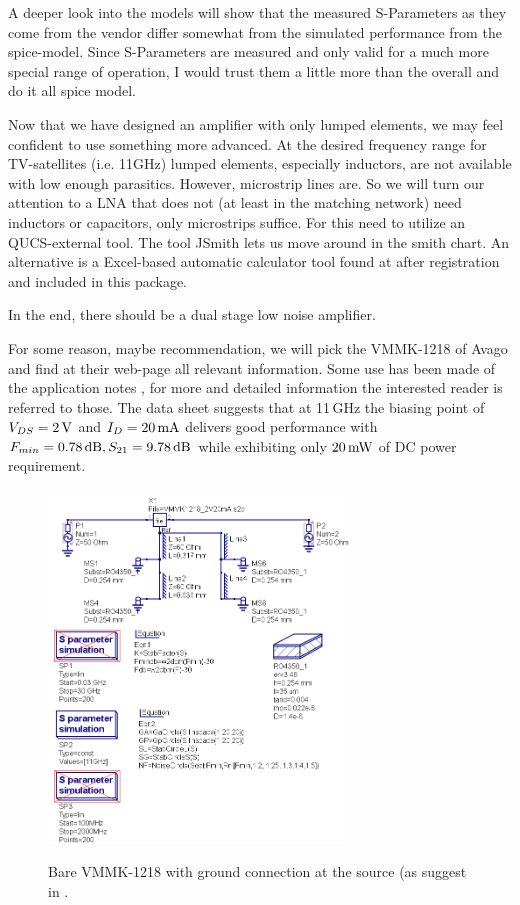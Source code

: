 A deeper look into the models will show that the measured S-Parameters
as they come from the vendor differ somewhat from the simulated
performance from the spice-model. Since S-Parameters are measured and
only valid for a much more special range of operation, I would trust
them a little more than the overall and do it all spice model.


Now that we have designed an amplifier with only lumped elements, we
may feel confident to use something more advanced. At the desired
frequency range for TV-satellites (i.e. 11GHz) lumped elements,
especially inductors, are not available with low enough
parasitics. However, microstrip lines are. So we will turn our
attention to a LNA that does not (at least in the matching network)
need inductors or capacitors, only microstrips suffice. For this need
to utilize an QUCS-external tool. The tool JSmith \cite{jsmith} lets
us move around in the smith chart. An alternative is a Excel-based
automatic calculator tool found at \cite{ibdrigodwn} after
registration and included in this package.

In the end, there should be a dual stage low noise amplifier.


For some reason, maybe recommendation, we will pick the VMMK-1218 of
Avago \cite{avagovmmk1218} and find at their web-page all relevant
information. Some use has been made of the application notes
\cite{avago_an5385,avago_an5408}, for more and detailed information
the interested reader is referred to those. The data sheet suggests
that at 11\,GHz the biasing point of $V_{DS}=2\,\mathrm{V}$ and
$I_D=20\,\mathrm{mA}$ delivers good performance with
$F_{min}=0.78\,\mathrm{dB}, S_{21}=9.78\,\mathrm{dB}$ while exhibiting
only $20\,\mathrm{mW}$ of DC power requirement.

\begin{figure}
  \centering
  {\includegraphics[width=8cm]{vmmk1218_1_sch.png}}
  \caption{Bare VMMK-1218 with ground connection at the source (as
    suggest in \cite{avagovmmk1218}.}
  \label{fig:vmmk1218_1_sch}
\end{figure}

